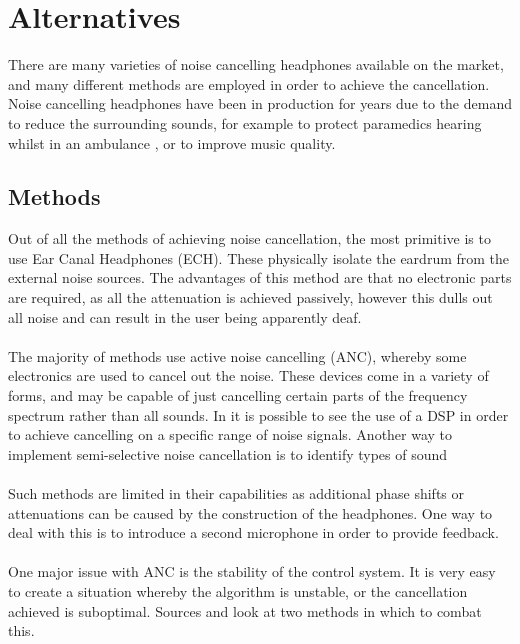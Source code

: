 \section{Alternatives}

There are many varieties of noise cancelling headphones available on the market, and many different methods are employed in order to achieve the cancellation.
Noise cancelling headphones have been in production for years due to the demand to reduce the surrounding sounds, for example to protect paramedics hearing whilst in an ambulance \cite{EMHeadsets}, or to improve music quality.

\subsection{Methods}
Out of all the methods of achieving noise cancellation, the most primitive is to use Ear Canal Headphones (ECH).
These physically isolate the eardrum from the external noise sources.
The advantages of this method are that no electronic parts are required, as all the attenuation is achieved passively, however this dulls out all noise and can result in the user being apparently deaf.
\\
\\
The majority of methods use active noise cancelling (ANC), whereby some electronics are used to cancel out the noise.
These devices come in a variety of forms, and may be capable of just cancelling certain parts of the frequency spectrum rather than all sounds.
In \cite{EMHeadsets} it is possible to see the use of a DSP in order to achieve cancelling on a specific range of noise signals.
Another way to implement semi-selective noise cancellation is to identify types of sound
\\
\\
Such methods are limited in their capabilities as additional phase shifts or attenuations can be caused by the construction of the headphones.
One way to deal with this is to introduce a second microphone \cite{2SensorANCAlg} in order to provide feedback.
\\
\\
One major issue with ANC is the stability of the control system.
It is very easy to create a situation whereby the algorithm is unstable, or the cancellation achieved is suboptimal.
Sources \cite{AuralEnvironmentAdjANC} and \cite{ANCOptimalControlInf} look at two methods in which to combat this.

